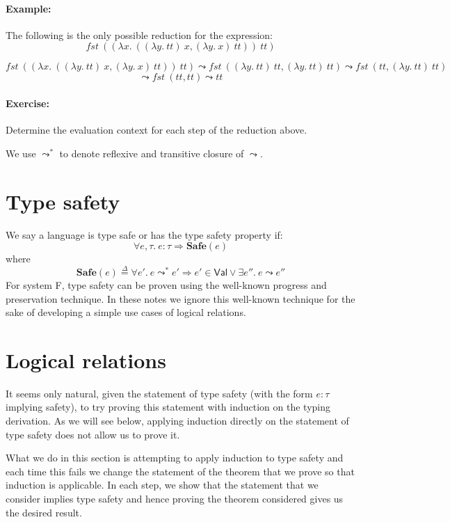 \documentclass{article}
\newcommand{\fst}{\mathit{fst}}
\newcommand{\TT}{\mathit{tt}}
\newcommand{\VAL}{\mathsf{Val}}
\newcommand{\defeq}{\overset{\Delta}{=}}
\begin{document}
\paragraph{Example:} The following is the only possible reduction
for the expression:
\[
\fst~((\lambda x.~((\lambda y.~ \TT)~x, (\lambda y.~ x)~\TT))~\TT)
\]

\[
\fst~((\lambda x.~((\lambda y.~ \TT)~x, (\lambda y.~ x)~\TT))~\TT) \leadsto
\fst~((\lambda y.~ \TT)~\TT, (\lambda y.~ \TT)~\TT) \leadsto
\fst~(\TT, (\lambda y.~ \TT)~\TT)
\]
\[
\leadsto \fst~(\TT, \TT) \leadsto \TT
\]

\paragraph{Exercise:} Determine the evaluation context for each step of the reduction above.

We use $\leadsto^*$ to denote reflexive and transitive closure of $\leadsto$.

\section{Type safety}
We say a language is type safe or has the type safety property if:
\[
\forall e, \tau.~e : \tau \Rightarrow \mathbf{Safe}(e)
\]
where
\[
\mathbf{Safe}(e) \defeq \forall e'.~ e \leadsto^* e'
\Rightarrow e' \in \VAL \lor \exists e''.~e\leadsto e''
\]
For system F, type safety can be proven using the well-known progress and preservation technique. In these notes we ignore this well-known technique for the sake of developing a simple use cases of logical relations.

\section{Logical relations}
It seems only natural, given the statement of type safety (with the form $e : \tau$ implying safety), to try proving this statement with induction on the typing derivation.
As we will see below, applying induction directly on the statement of type safety does not allow us to prove it.

What we do in this section is attempting to apply induction to type safety and each time this fails we change the statement of the theorem that we prove so that induction is applicable. In each step, we show that the statement that we consider implies type safety and hence proving the theorem considered gives us the desired result.
\end{document}
